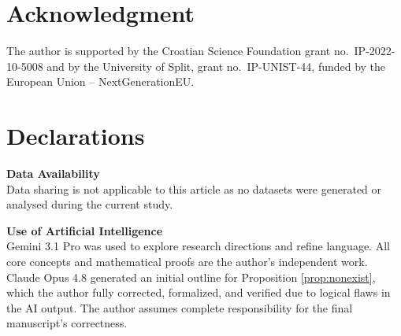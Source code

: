 \documentclass[12pt]{amsart}
\theoremstyle{definition}
\begin{document}
\section*{Acknowledgment}
{The author is supported by the Croatian Science Foundation grant no.~IP-2022-10-5008 and by the University of Split, grant no.~IP-UNIST-44, funded by the European Union -- NextGenerationEU.}

\section*{Declarations}

\textbf{Data Availability} \\
Data sharing is not applicable to this article as no datasets were generated or analysed during the current study.

\vspace{1em}

\textbf{Use of Artificial Intelligence} \\
Gemini 3.1 Pro was used to explore research directions and refine language. All core concepts and mathematical proofs are the author's independent work. Claude Opus 4.8 generated an initial outline for Proposition \ref{prop:nonexist}, which the author fully corrected, formalized, and verified due to logical flaws in the AI output. The author assumes complete responsibility for the final manuscript's correctness.
\end{document}

